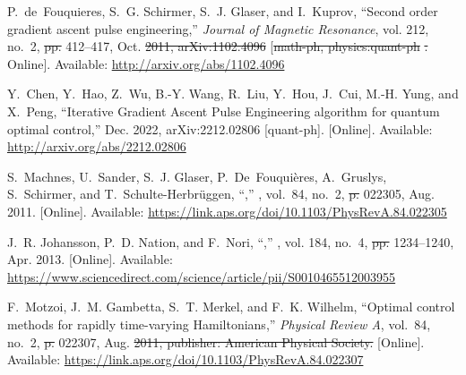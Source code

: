 \documentclass[a4paper,oneside,11pt]{book}
\providecommand{\DIFaddtex}[1]{{\protect\color{blue}\uwave{#1}}} %
\providecommand{\DIFdeltex}[1]{{\protect\color{red}\sout{#1}}}                      %
\providecommand{\DIFaddbegin}{} %
\providecommand{\DIFaddend}{} %
\providecommand{\DIFdelbegin}{} %
\providecommand{\DIFdelend}{} %
\providecommand{\DIFadd}[1]{\texorpdfstring{\DIFaddtex{#1}}{#1}} %
\providecommand{\DIFdel}[1]{\texorpdfstring{\DIFdeltex{#1}}{}} %
\newcommand{\DIFscaledelfig}{0.5}
\newlength{\DIFdelgraphicswidth} %
\newlength{\DIFdelgraphicsheight} %
\newcommand{\DIFaddincludegraphics}[2][]{{\color{blue}\fbox{\DIFOincludegraphics[#1]{#2}}}} %
\newcommand{\DIFdelincludegraphics}[2][]{%
\sbox{\DIFdelgraphicsbox}{\DIFOincludegraphics[#1]{#2}}%
\settoboxwidth{\DIFdelgraphicswidth}{\DIFdelgraphicsbox} %
\settoboxtotalheight{\DIFdelgraphicsheight}{\DIFdelgraphicsbox} %
\scalebox{\DIFscaledelfig}{%
\parbox[b]{\DIFdelgraphicswidth}{\usebox{\DIFdelgraphicsbox}\\[-\baselineskip] \rule{\DIFdelgraphicswidth}{0em}}\llap{\resizebox{\DIFdelgraphicswidth}{\DIFdelgraphicsheight}{%
\setlength{\unitlength}{\DIFdelgraphicswidth}%
\begin{picture}(1,1)%
\thicklines\linethickness{2pt} %
{\color[rgb]{1,0,0}\put(0,0){\framebox(1,1){}}}%
{\color[rgb]{1,0,0}\put(0,0){\line( 1,1){1}}}%
{\color[rgb]{1,0,0}\put(0,1){\line(1,-1){1}}}%
\end{picture}%
}\hspace*{3pt}}} %
} %
\DeclareRobustCommand{\DIFaddbegin}{\DIFOaddbegin \let\includegraphics\DIFaddincludegraphics} %
\DeclareRobustCommand{\DIFaddend}{\DIFOaddend \let\includegraphics\DIFOincludegraphics} %
\DeclareRobustCommand{\DIFdelbegin}{\DIFOdelbegin \let\includegraphics\DIFdelincludegraphics} %
\DeclareRobustCommand{\DIFdelend}{\DIFOaddend \let\includegraphics\DIFOincludegraphics} %
\begin{document}
\begin{thebibliography}{100}
\BIBentryALTinterwordspacing
P.~de~Fouquieres, S.~G. Schirmer, S.~J. Glaser, and I.~Kuprov, ``Second order
  gradient ascent pulse engineering,'' \emph{Journal of Magnetic Resonance},
  vol. 212, no.~2,  \DIFdelbegin \DIFdel{pp. }\DIFdelend 412--417, Oct. \DIFdelbegin \DIFdel{2011, arXiv:1102.4096 }\DIFdelend \DIFaddbegin \DIFadd{2011. }\DIFaddend [\DIFdelbegin \DIFdel{math-ph,
  physics:quant-ph}%
\DIFdel{. }%
\DIFdelend Online]. Available:
  \url{http://arxiv.org/abs/1102.4096}
\BIBentrySTDinterwordspacing

\BIBentryALTinterwordspacing
Y.~Chen, Y.~Hao, Z.~Wu, B.-Y. Wang, R.~Liu, Y.~Hou, J.~Cui, M.-H. Yung, and
  X.~Peng, ``Iterative {Gradient} {Ascent} {Pulse} {Engineering} algorithm for
  quantum optimal control,'' Dec. 2022, arXiv:2212.02806 [quant-ph]. [Online].
  Available: \url{http://arxiv.org/abs/2212.02806}
\BIBentrySTDinterwordspacing

\BIBentryALTinterwordspacing
S.~Machnes, U.~Sander, S.~J. Glaser, P.~De~Fouquières, A.~Gruslys,
  S.~Schirmer, and T.~Schulte-Herbrüggen, ``,'' \emph{},
  vol.~84, no.~2,  \DIFdelbegin \DIFdel{p. }\DIFdelend 022305, Aug. 2011. [Online]. Available:
  \url{https://link.aps.org/doi/10.1103/PhysRevA.84.022305}
\BIBentrySTDinterwordspacing

\BIBentryALTinterwordspacing
J.~R. Johansson, P.~D. Nation, and F.~Nori, ``,''
  \emph{}, vol. 184,
  no.~4,  \DIFdelbegin \DIFdel{pp. }\DIFdelend 1234--1240, Apr. 2013. [Online]. Available:
  \url{https://www.sciencedirect.com/science/article/pii/S0010465512003955}
\BIBentrySTDinterwordspacing

\BIBentryALTinterwordspacing
F.~Motzoi, J.~M. Gambetta, S.~T. Merkel, and F.~K. Wilhelm, ``Optimal control
  methods for rapidly time-varying {Hamiltonians},'' \emph{Physical Review A},
  vol.~84, no.~2,  \DIFdelbegin \DIFdel{p. }\DIFdelend 022307, Aug. \DIFdelbegin \DIFdel{2011, publisher: American Physical Society.
  }\DIFdelend \DIFaddbegin \DIFadd{2011. }\DIFaddend [Online]. Available:
  \url{https://link.aps.org/doi/10.1103/PhysRevA.84.022307}
\BIBentrySTDinterwordspacing


\end{thebibliography}
\end{document}
